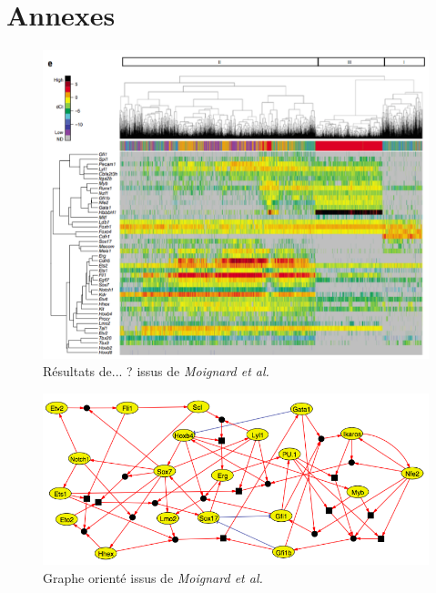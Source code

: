\documentclass[fleqn,11pt]{SelfArx} %
\providecommand\phantomsection{}
\begin{document}
\newpage
\phantomsection



\newpage
\section*{Annexes}

\begin{figure}[ht]
\centering
\includegraphics[width=\linewidth]{images/article2}
\caption{Résultats de... ? issus de \textit{Moignard et al.}}
\label{fig:artcile2}
\end{figure}

\begin{figure}[ht]
\centering
\includegraphics[width=\linewidth]{images/article3}
\caption{Graphe orienté issus de \textit{Moignard et al.}}
\label{fig:artcile2}
\end{figure}
\end{document}
